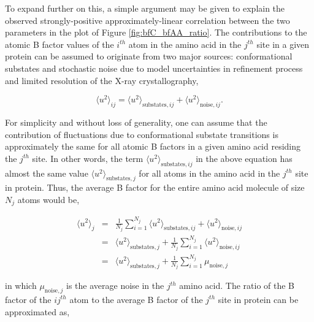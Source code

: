 \documentclass[11pt]{article}
\begin{document}
\begin{appendices}

    To expand further on this, a simple argument may be given to explain the observed strongly-positive approximately-linear correlation between the two parameters in the plot of Figure \ref{fig:bfC_bfAA_ratio}. The contributions to the atomic B factor values of the $i^{th}$ atom in the amino acid in the $j^{th}$ site in a given protein can be assumed to originate from two major sources: conformational substates and stochastic noise due to model uncertainties in refinement process and limited resolution of the X-ray crystallography,

    \begin{equation}
        \label{eqn:bf_comp}
        \langle u^2 \rangle_{ij} = \langle u^2 \rangle_{\text{substates},ij} + \langle u^2 \rangle_{\text{noise},ij}.
    \end {equation}

    For simplicity and without loss of generality, one can assume that the contribution of fluctuations due to conformational substate transitions is approximately the same for all atomic B factors in a given amino acid residing the $j^{th}$ site. In other words, the term $\langle u^2 \rangle_{\text{substates},ij}$ in the above equation has almost the same value $\langle u^2 \rangle_{\text{substates},j}$ for all atoms in the amino acid in the $j^{th}$ site in protein. Thus, the average B factor for the entire amino acid molecule of size $N_j$ atoms would be,

    \begin{eqnarray}
        \label{eqn:bf_avg}
        \langle u^2 \rangle_{j} &=& \frac{1}{N_j} \sum_{i=1}^{N_j} \langle u^2 \rangle_{\text{substates},ij} + \langle u^2 \rangle_{\text{noise},ij} \nonumber \\
                                &=& \langle u^2 \rangle_{\text{substates},j} + \frac{1}{N_j} \sum_{i=1}^{N_j} \langle u^2 \rangle_{\text{noise},ij} \nonumber \\
                                &=& \langle u^2 \rangle_{\text{substates},j} + \frac{1}{N_j} \sum_{i=1}^{N_j} \mu_{\text{noise},j}
    \end {eqnarray}

    \noindent in which $\mu_{\text{noise},j}$ is the average noise in the $j^{th}$ amino acid. The ratio of the B factor of the $ij^{th}$ atom to the average B factor of the $j^{th}$ site in protein can be approximated as,


\end{appendices}
\end{document}
